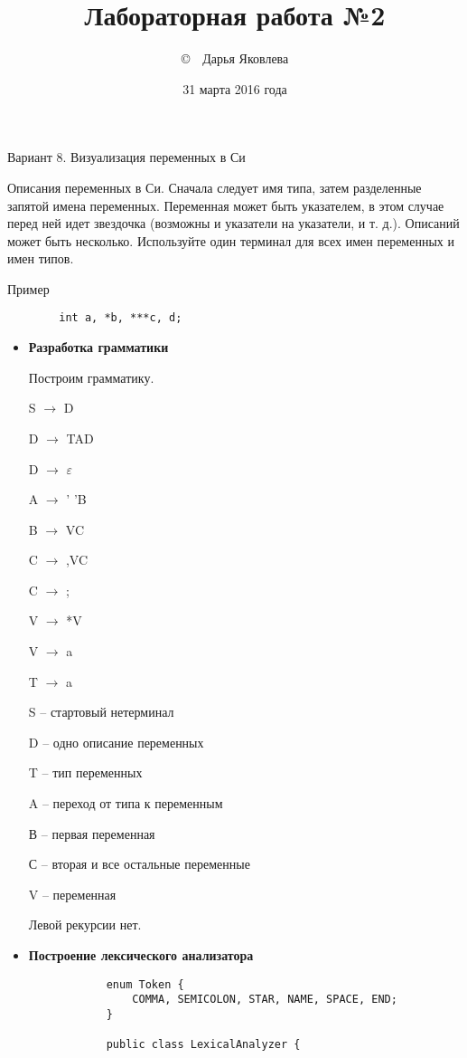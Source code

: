 \documentclass[12pt]{article}
\title{Лабораторная работа №2}
\author{\copyright~~Дарья Яковлева}
\date{31 марта 2016 года}
\begin{document}
\maketitle
\thispagestyle{empty}
Вариант 8. Визуализация переменных в Си

Описания переменных в Си. Сначала следует имя типа, затем
разделенные  запятой  имена  переменных.  Переменная  может  быть
указателем, в этом случае перед ней идет звездочка (возможны и
указатели на указатели, и т. д.). Описаний может быть несколько.
Используйте один терминал для всех имен переменных и имен типов.

Пример

	\begin{verbatim}
		int a, *b, ***c, d;
	\end{verbatim}

\begin{itemize}
	\item \textbf{Разработка грамматики}

			Построим грамматику.

			S $\rightarrow$ D

			D $\rightarrow$ TAD

			D $\rightarrow$ $\varepsilon$

			A $\rightarrow$ ' 'B

			B $\rightarrow$ VC

			C $\rightarrow$ ,VC

			C $\rightarrow$ ;

			V $\rightarrow$ *V

			V $\rightarrow$ a

			T $\rightarrow$ a

			S -- стартовый нетерминал

			D -- одно описание переменных

			T -- тип переменных

			A -- переход от типа к переменным

			В -- первая переменная

			С -- вторая и все остальные переменные

			V -- переменная

			Левой рекурсии нет.

	\item \textbf{Построение лексического анализатора}
		\begin{verbatim}
			enum Token {
			    COMMA, SEMICOLON, STAR, NAME, SPACE, END;
			}
			
			public class LexicalAnalyzer {
			

\end{verbatim}
\end{itemize}
\end{document}
